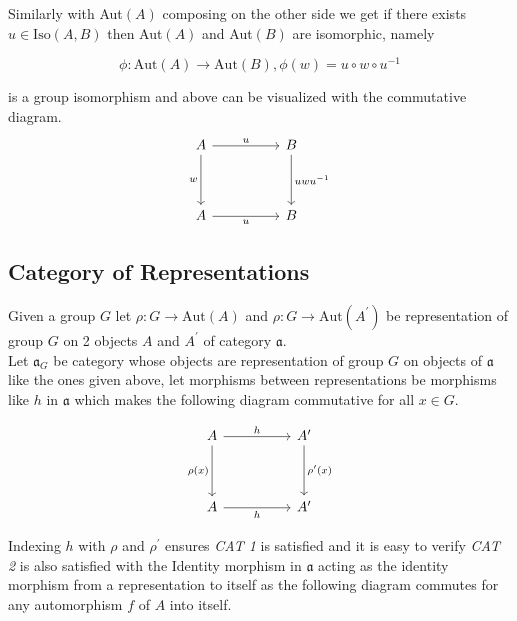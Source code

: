 \documentclass[11pt,a4paper]{colorart}
\def\mab{\mathfrak}
\def\oo{\circ}
\def\ra{\rightarrow}
\begin{document}
Similarly with Aut$(A)$ composing on the other side we get if there exists $u \in \text{Iso}(A,B)$ then Aut$(A)$ and Aut$(B)$ are isomorphic, namely 

\[ \phi : \text{Aut}(A) \ra \text{Aut}(B), \phi(w) = u \oo w \oo u^{-1} \]

is a group isomorphism and above can be visualized with the commutative diagram.\\

\[\begin{tikzcd}
	A && B \\
	\\
	A && B
	\arrow["w"', from=1-1, to=3-1]
	\arrow["{u w u^{-1}}", from=1-3, to=3-3]
	\arrow["u", from=1-1, to=1-3]
	\arrow["u"', from=3-1, to=3-3]
\end{tikzcd}\]

\subsection{Category of Representations}

Given a group $G$ let $\rho : G \ra \text{Aut}(A)$ and $\rho : G \ra \text{Aut}(A^\prime)$ be representation of group $G$ on 2 objects $A$ and $A^\prime$ of category $\mab{a}$.\\ 

Let $\mab{a}_G$ be category whose objects are representation of group $G$ on objects of $\mab{a}$ like the ones given above, let morphisms between representations be morphisms like $h$ in $\mab{a}$ which makes the following diagram commutative for all $x\in G$.

\[\begin{tikzcd}
	A && {A^\prime} \\
	\\
	A && {A^\prime}
	\arrow["{\rho(x)}"', from=1-1, to=3-1]
	\arrow["h"', from=3-1, to=3-3]
	\arrow["{\rho^\prime(x)}", from=1-3, to=3-3]
	\arrow["h", from=1-1, to=1-3]
\end{tikzcd}\]

Indexing $h$ with $\rho$ and $\rho^\prime$ ensures \textit{CAT 1} is satisfied and it is easy to verify \textit{CAT 2} is also satisfied with the Identity morphism in $\mab{a}$ acting as the identity morphism from a representation to itself as the following diagram commutes for any automorphism $f$ of $A$ into itself.
\end{document}
